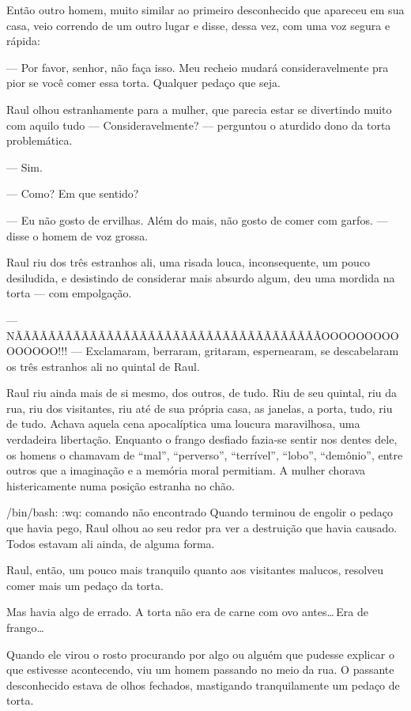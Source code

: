 Então outro homem, muito similar ao primeiro desconhecido que apareceu em sua casa, veio correndo de um outro lugar e disse, dessa vez, com uma voz segura e rápida:

--- Por favor, senhor, não faça isso. Meu recheio mudará consideravelmente pra pior se você comer essa torta. Qualquer pedaço que seja.

Raul olhou estranhamente para a mulher, que parecia estar se divertindo muito com aquilo tudo --- Consideravelmente? --- perguntou o aturdido dono da torta problemática.

--- Sim.

--- Como? Em que sentido?

--- Eu não gosto de ervilhas. Além do mais, não gosto de comer com garfos. --- disse o homem de voz grossa.

Raul riu dos três estranhos ali, uma risada louca, inconsequente, um pouco desiludida, e desistindo de considerar mais absurdo algum, deu uma mordida na torta --- com empolgação.

\sloppy
--- N\-Ã\-Ã\-Ã\-Ã\-Ã\-Ã\-Ã\-Ã\-Ã\-Ã\-Ã\-Ã\-Ã\-Ã\-Ã\-Ã\-Ã\-Ã\-Ã\-Ã\-Ã\-Ã\-ÃÃ\-Ã\-Ã\-Ã\-Ã\-Ã\-Ã\-Ã\-Ã\-Ã\-Ã\-Ã\-Ã\-Ã\-O\-O\-O\-O\-O\-O\-O\-O\-O\-O\-O\-O\-O\-O\-O!!! --- Exclamaram, berraram, gritaram, espernearam, se descabelaram os três estranhos ali no quintal de Raul.

Raul riu ainda mais de si mesmo, dos outros, de tudo. Riu de seu quintal, riu da rua, riu dos visitantes, riu até de sua própria casa, as janelas, a porta, tudo, riu de tudo. Achava aquela cena apocalíptica uma loucura maravilhosa, uma verdadeira libertação. Enquanto o frango desfiado fazia-se sentir nos dentes dele, os homens o chamavam de ``mal'', ``perverso'', ``terrível'', ``lobo'', ``demônio'', entre outros que a imaginação e a memória moral permitiam. A mulher chorava histericamente numa posição estranha no chão.

/bin/bash: :wq: comando não encontrado
Quando terminou de engolir o pedaço que havia pego, Raul olhou ao seu redor pra ver a destruição que havia causado. Todos estavam ali ainda, de alguma forma.

Raul, então, um pouco mais tranquilo quanto aos visitantes malucos, resolveu comer mais um pedaço da torta.

Mas havia algo de errado. A torta não era de carne com ovo antes\ldots\,Era de frango\ldots

Quando ele virou o rosto procurando por algo ou alguém que pudesse explicar o que estivesse acontecendo, viu um homem passando no meio da rua. O passante desconhecido estava de olhos fechados, mastigando tranquilamente um pedaço de torta.

